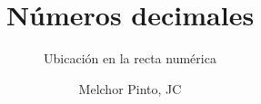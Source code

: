 \documentclass{guia}
\title{Números decimales}
\subtitle{Ubicación en la recta numérica}
\author{Melchor Pinto, JC}
\begin{document}
%
\begin{questions}
\questionboxed{}
\end{questions}
\end{document}
